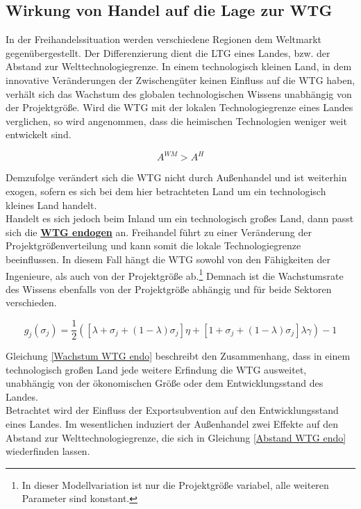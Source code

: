 \subsection{Wirkung von Handel auf die Lage zur WTG}\label{sec:Wirkung von Handel auf die Lage zur Welttechnologiegrenze} \label{Efekkte}

In der Freihandelssituation werden verschiedene Regionen dem Weltmarkt gegenübergestellt. Der Differenzierung dient die LTG eines Landes, bzw. der Abstand zur Welttechnologiegrenze. In einem technologisch kleinen Land, in dem innovative Veränderungen der Zwischengüter keinen Einfluss auf die WTG haben, verhält sich das Wachstum des globalen technologischen Wissens unabhängig von der Projektgrö{\ss}e. Wird die WTG mit der lokalen Technologiegrenze eines Landes verglichen, so wird angenommen, dass die heimischen Technologien weniger weit entwickelt sind. 


	\begin{equation}
		A^{WM}>A^H
	\end{equation}
	
	
Demzufolge verändert sich die WTG nicht durch Au{\ss}enhandel und ist weiterhin exogen, sofern es sich bei dem hier betrachteten Land um ein technologisch kleines Land handelt.\\ 
Handelt es sich jedoch beim Inland um ein technologisch gro{\ss}es Land, dann passt sich die \textbf{\uline{WTG endogen}} an.  Freihandel führt zu einer Veränderung der Projektgrö{\ss}enverteilung und kann somit die lokale Technologiegrenze beeinflussen.   
In diesem Fall hängt die WTG sowohl von den Fähigkeiten der Ingenieure, als auch von der Projektgrö{\ss}e ab.\footnote{In dieser Modellvariation ist nur die Projektgrö{\ss}e variabel, alle weiteren Parameter sind konstant.} Demnach ist die Wachstumsrate des Wissens ebenfalls von der Projektgrö{\ss}e abhängig und für beide Sektoren verschieden. 


	\begin{equation}
		g_j(\sigma_j)=\frac{1}{2}\left([\lambda+\sigma_j+(1-\lambda)\sigma_j]\eta+[1+\sigma_j+(1-\lambda)\sigma_j]\lambda\gamma\right)-1\label{Wachstum WTG endo}
	\end{equation}


Gleichung \eqref{Wachstum WTG endo} beschreibt den Zusammenhang, dass in einem technologisch gro{\ss}en Land jede weitere Erfindung die WTG ausweitet, unabhängig von der ökonomischen Grö{\ss}e oder dem Entwicklungsstand des Landes.\\
Betrachtet wird der Einfluss der Exportsubvention auf den Entwicklungsstand eines Landes. Im wesentlichen induziert der Au{\ss}enhandel zwei Effekte auf den Abstand zur Welttechnologiegrenze, die sich in Gleichung \eqref{Abstand WTG endo} wiederfinden lassen.  


